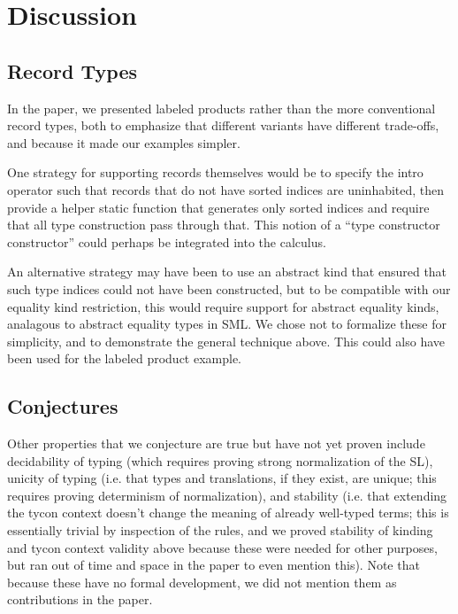 \documentclass[12pt]{article}
\begin{document}
\section{Discussion}
\subsection{Record Types}
In the paper, we presented labeled products rather than the more conventional record types, both to emphasize that different variants have different trade-offs, and because it made our examples simpler.

One strategy for supporting records themselves would be to specify the intro operator such that records that do not have sorted indices are uninhabited, then provide a helper static function that generates only sorted indices and require that all type construction pass through that. This notion of a ``type constructor constructor'' could perhaps be integrated into the calculus.

An alternative strategy may have been to use an abstract kind that ensured that such type indices could not have been constructed, but to be compatible with our equality kind restriction, this would require support for abstract equality kinds, analagous to abstract equality types in SML. We chose not to formalize these for simplicity, and to demonstrate the general technique above. This could also have been used for the labeled product example.

\subsection{Conjectures}
Other properties that we conjecture are true but have not yet proven include decidability of typing (which requires proving strong normalization of the SL), unicity of typing (i.e. that types and translations, if they exist, are unique; this requires proving determinism of normalization), and stability (i.e. that extending the tycon context doesn't change the meaning of already well-typed terms; this is essentially trivial by inspection of the rules, and we proved stability of kinding and tycon context validity above because these were needed for other purposes, but ran out of time and space in the paper to even mention this). Note that because these have no formal development, we did not mention them as contributions in the paper.
\end{document}
